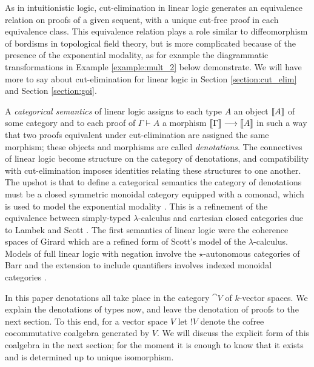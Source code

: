 \documentclass[english,letter paper,12pt,reqno]{article}
\theoremstyle{example}
\numberwithin{equation}{section}
\begin{document}
As in intuitionistic logic, cut-elimination in linear logic generates an equivalence relation on proofs of a given sequent, with a unique cut-free proof in each equivalence class. This equivalence relation plays a role similar to diffeomorphism of bordisms in topological field theory, but is more complicated because of the presence of the exponential modality, as for example the diagrammatic transformations in Example \ref{example:mult_2} below demonstrate. We will have more to say about cut-elimination for linear logic in Section \ref{section:cut_elim} and Section \ref{section:goi}.

A \emph{categorical semantics} of linear logic \cite{mellies, blue_book} assigns to each type $A$ an object $\llbracket A \rrbracket$ of some category and to each proof of $\Gamma \vdash A$ a morphism $\llbracket \Gamma \rrbracket \longrightarrow \llbracket A \rrbracket$ in such a way that two proofs equivalent under cut-elimination are assigned the same morphism; these objects and morphisms are called \emph{denotations}. The connectives of linear logic become structure on the category of denotations, and compatibility with cut-elimination imposes identities relating these structures to one another. The upshot is that to define a categorical semantics the category of denotations must be a closed symmetric monoidal category equipped with a comonad, which is used to model the exponential modality \cite[\S 7]{mellies}. This is a refinement of the equivalence between simply-typed $\lambda$-calculus and cartesian closed categories due to Lambek and Scott \cite{lambek}. The first semantics of linear logic were the coherence spaces of Girard \cite[\S 3]{girard_llogic} which are a refined form of Scott's model of the $\lambda$-calculus. Models of full linear logic with negation involve the $\star$-autonomous categories of Barr \cite{barr_auto,barr_acc,barr_autolin} and the extension to include quantifiers involves indexed monoidal categories \cite{seely}.

In this paper denotations all take place in the category $\cat{V}$ of $k$-vector spaces. We explain the denotations of types now, and leave the denotation of proofs to the next section. To this end, for a vector space $V$ let ${!} V$ denote the cofree cocommutative coalgebra generated by $V$. We will discuss the explicit form of this coalgebra in the next section; for the moment it is enough to know that it exists and is determined up to unique isomorphism.
\end{document}
